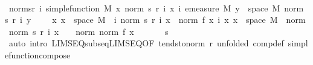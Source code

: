 \begin{isabellebody}
\isanewline
\ \ \isamarkupfalse%
\ norm{\isacharunderscore}{\kern0pt}s{\isacharunderscore}{\kern0pt}r{\isacharcolon}{\kern0pt}\ {\isachardoublequoteopen}{\isasymAnd}i{\isachardot}{\kern0pt}\ simple{\isacharunderscore}{\kern0pt}function\ M\ {\isacharparenleft}{\kern0pt}{\isasymlambda}x{\isachardot}{\kern0pt}\ norm\ {\isacharparenleft}{\kern0pt}s\ {\isacharparenleft}{\kern0pt}r\ i{\isacharparenright}{\kern0pt}\ x{\isacharparenright}{\kern0pt}{\isacharparenright}{\kern0pt}{\isachardoublequoteclose}\ {\isachardoublequoteopen}{\isasymAnd}i{\isachardot}{\kern0pt}\ emeasure\ M\ {\isacharbraceleft}{\kern0pt}y\ {\isasymin}\ space\ M{\isachardot}{\kern0pt}\ norm\ {\isacharparenleft}{\kern0pt}s\ {\isacharparenleft}{\kern0pt}r\ i{\isacharparenright}{\kern0pt}\ y{\isacharparenright}{\kern0pt}\ {\isasymnoteq}\ {}{\isacharbraceright}{\kern0pt}\ {\isasymnoteq}\ {\isasyminfinity}{\isachardoublequoteclose}\ {\isachardoublequoteopen}{\isasymAnd}x{\isachardot}{\kern0pt}\ x\ {\isasymin}\ space\ M\ {\isasymLongrightarrow}\ {\isacharparenleft}{\kern0pt}{\isasymlambda}i{\isachardot}{\kern0pt}\ norm\ {\isacharparenleft}{\kern0pt}s\ {\isacharparenleft}{\kern0pt}r\ i{\isacharparenright}{\kern0pt}\ x{\isacharparenright}{\kern0pt}{\isacharparenright}{\kern0pt}\ {\isasymlonglonglongrightarrow}\ norm\ {\isacharparenleft}{\kern0pt}f\ x{\isacharparenright}{\kern0pt}{\isachardoublequoteclose}\ {\isachardoublequoteopen}{\isasymAnd}i\ x{\isachardot}{\kern0pt}\ x\ {\isasymin}\ space\ M\ {\isasymLongrightarrow}\ norm\ {\isacharparenleft}{\kern0pt}norm\ {\isacharparenleft}{\kern0pt}s\ {\isacharparenleft}{\kern0pt}r\ i{\isacharparenright}{\kern0pt}\ x{\isacharparenright}{\kern0pt}{\isacharparenright}{\kern0pt}\ {\isasymle}\ {}\ {\isacharasterisk}{\kern0pt}\ norm\ {\isacharparenleft}{\kern0pt}norm\ {\isacharparenleft}{\kern0pt}f\ x{\isacharparenright}{\kern0pt}{\isacharparenright}{\kern0pt}{\isachardoublequoteclose}\ \isanewline
\ \ \ \ \isamarkupfalse%
\ s\ \isamarkupfalse%
\ {\isacharparenleft}{\kern0pt}auto\ intro{\isacharcolon}{\kern0pt}\ LIMSEQ{\isacharunderscore}{\kern0pt}subseq{\isacharunderscore}{\kern0pt}LIMSEQ{\isacharbrackleft}{\kern0pt}OF\ tendsto{\isacharunderscore}{\kern0pt}norm\ r{\isacharparenleft}{\kern0pt}{}{\isacharparenright}{\kern0pt}{\isacharcomma}{\kern0pt}\ unfolded\ comp{\isacharunderscore}{\kern0pt}def{\isacharbrackright}{\kern0pt}\ simple{\isacharunderscore}{\kern0pt}function{\isacharunderscore}{\kern0pt}compose{}{\isacharparenright}{\kern0pt}\ \isanewline
\ \ \isanewline

\end{isabellebody}
